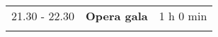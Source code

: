 \begin{longtable}{p{3cm}p{10cm}p{4cm}}
\vspace{1cm}
21.30 - 22.30 & {\bf Opera gala} & \hfill 1 h 0 min\\ 
\vspace{1cm}
\end{longtable}

